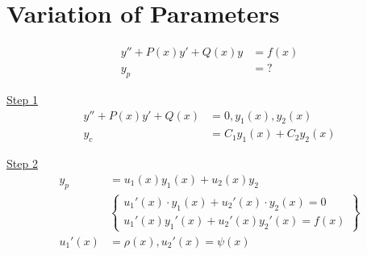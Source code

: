 \documentclass[10pt, letterpaper]{article}
\begin{document}
\section{Variation of Parameters}
\begin{align*}
y'' +P(x)y' +Q(x)y &= f(x)\\
y_p &= ?
\end{align*}

\underline{Step 1}
\begin{align*}
y'' +P(x)y' +Q(x) &= 0, y_1(x), y_2(x)\\
y_c &= C_1y_1(x) +C_2y_2(x)
\end{align*}

\underline{Step 2}
\begin{align*}
y_p &= u_1(x)y_1(x) +u_2(x)y_2\\
&\begin{Bmatrix}
	u_1'(x) \cdot y_1(x) +u_2'(x) \cdot y_2(x) =0\\
	u_1'(x)y_1'(x) +u_2'(x)y_2'(x) =f(x)
\end{Bmatrix}\\
u_1'(x) &= \rho(x), u_2'(x)=\psi(x)
\end{align*}
\end{document}
